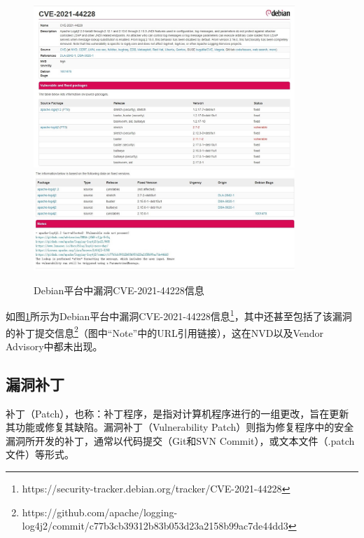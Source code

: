 

\begin{figure}[h]
    \centering
    \includegraphics[width=0.88\textwidth]{res/debian-2021-44228}
    \includegraphics[width=0.88\textwidth]{res/debian-2021-44228-2}
    \caption{Debian平台中漏洞CVE-2021-44228信息}
    \label{fig:debian-2021-44228}
\end{figure}
如图\ref{fig:debian-2021-44228}所示为Debian平台中漏洞CVE-2021-44228信息\footnote{https://security-tracker.debian.org/tracker/CVE-2021-44228}，其中还甚至包括了该漏洞的补丁提交信息\footnote{https://github.com/apache/logging-log4j2/commit/c77b3cb39312b83b053d23a2158b99ac7de44dd3}（图中“Note”中的URL引用链接），这在NVD以及Vendor Advisory中都未出现。


\subsection{漏洞补丁}
补丁（Patch），也称：补丁程序，是指对计算机程序进行的一组更改，旨在更新其功能或修复其缺陷。漏洞补丁（Vulnerability Patch）则指为修复程序中的安全漏洞所开发的补丁，通常以代码提交（Git和SVN Commit），或文本文件（.patch文件）等形式。

